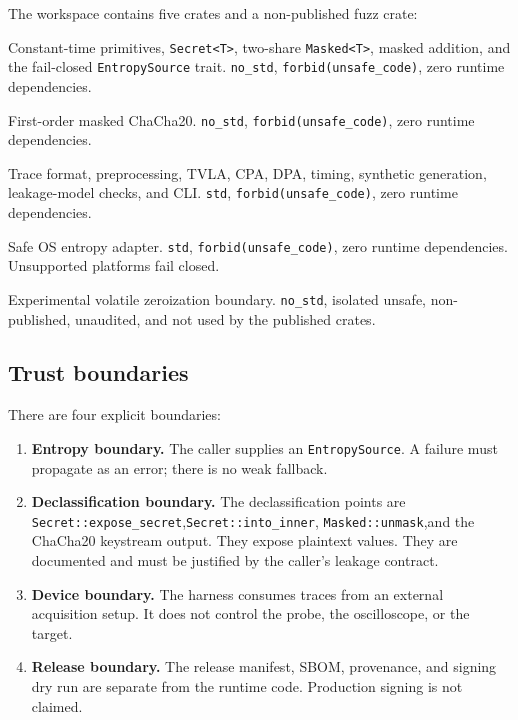 \documentclass[11pt,a4paper]{article}
\newcommand{\code}[1]{\texttt{#1}}
\theoremstyle{plain}
\theoremstyle{definition}
\theoremstyle{remark}
\begin{document}
The workspace contains five crates and a non-published fuzz crate:

\begin{description}[leftmargin=1.5em]
  \item[\code{sicas-core}] Constant-time primitives, \code{Secret<T>}, two-share
        \code{Masked<T>}, masked addition, and the fail-closed \code{EntropySource}
        trait. \code{no\_std}, \code{forbid(unsafe\_code)}, zero runtime dependencies.
  \item[\code{sicas-reference}] First-order masked ChaCha20. \code{no\_std},
        \code{forbid(unsafe\_code)}, zero runtime dependencies.
  \item[\code{sicas-harness}] Trace format, preprocessing, TVLA, CPA, DPA, timing,
        synthetic generation, leakage-model checks, and CLI. \code{std},
        \code{forbid(unsafe\_code)}, zero runtime dependencies.
  \item[\code{sicas-platform}] Safe OS entropy adapter. \code{std},
        \code{forbid(unsafe\_code)}, zero runtime dependencies. Unsupported platforms
        fail closed.
  \item[\code{sicas-zeroize}] Experimental volatile zeroization boundary.
        \code{no\_std}, isolated unsafe, non-published, unaudited, and not used by the
        published crates.
\end{description}

\subsection{Trust boundaries}

There are four explicit boundaries:

\begin{enumerate}[leftmargin=1.5em]
  \item \textbf{Entropy boundary.} The caller supplies an \code{EntropySource}. A
        failure must propagate as an error; there is no weak fallback.
  \item \textbf{Declassification boundary.} The declassification points are
        \code{Secret::expose\_secret},\allowbreak \code{Secret::into\_inner},\allowbreak
        \code{Masked::unmask},\allowbreak and the ChaCha20 keystream output. They expose
        plaintext values. They are documented and must be justified by
        the caller's leakage contract.
  \item \textbf{Device boundary.} The harness consumes traces from an external
        acquisition setup. It does not control the probe, the oscilloscope, or the
        target.
  \item \textbf{Release boundary.} The release manifest, SBOM, provenance, and signing
        dry run are separate from the runtime code. Production signing is not claimed.
\end{enumerate}
\end{document}
